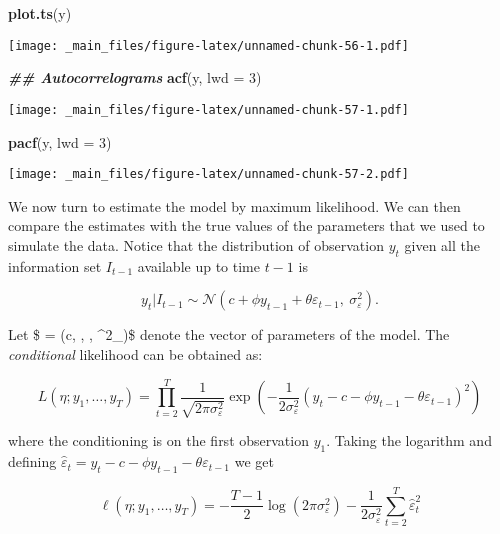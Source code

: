 \documentclass[
]{book}
\newenvironment{Shaded}{\begin{snugshade}}{\end{snugshade}}
\newcommand{\AttributeTok}[1]{\textcolor[rgb]{0.13,0.29,0.53}{#1}}
\newcommand{\DecValTok}[1]{\textcolor[rgb]{0.00,0.00,0.81}{#1}}
\newcommand{\DocumentationTok}[1]{\textcolor[rgb]{0.56,0.35,0.01}{\textbf{\textit{#1}}}}
\newcommand{\FunctionTok}[1]{\textcolor[rgb]{0.13,0.29,0.53}{\textbf{#1}}}
\newcommand{\NormalTok}[1]{#1}
\begin{document}
\begin{Shaded}
\begin{Highlighting}[]
\FunctionTok{plot.ts}\NormalTok{(y)}
\end{Highlighting}
\end{Shaded}

\texttt{[image: \_main\_files/figure-latex/unnamed-chunk-56-1.pdf]}

\begin{Shaded}
\begin{Highlighting}[]
\DocumentationTok{\#\# Autocorrelograms}
\FunctionTok{acf}\NormalTok{(y, }\AttributeTok{lwd =} \DecValTok{3}\NormalTok{)}
\end{Highlighting}
\end{Shaded}

\texttt{[image: \_main\_files/figure-latex/unnamed-chunk-57-1.pdf]}

\begin{Shaded}
\begin{Highlighting}[]
\FunctionTok{pacf}\NormalTok{(y, }\AttributeTok{lwd =} \DecValTok{3}\NormalTok{)}
\end{Highlighting}
\end{Shaded}

\texttt{[image: \_main\_files/figure-latex/unnamed-chunk-57-2.pdf]}

We now turn to estimate the model by maximum likelihood. We can then compare the estimates with the true values of the parameters that we used to simulate the data. Notice that the distribution of observation \(y_t\) given all the information set \(I_{t-1}\) available up to time \(t-1\) is

\[
y_t | I_{t-1} \sim \mathcal{N}(c + \phi y_{t-1} + \theta \varepsilon_{t-1}, \ \sigma^2_\varepsilon).
\]

Let \$ \eta = (c, \phi, \theta, \sigma\^{}2\_\varepsilon)\$ denote the vector of parameters of the model. The \emph{conditional} likelihood can be obtained as:

\[
L(\eta; y_1, \dots, y_T) = \prod_{t=2}^T \frac{1}{\sqrt{2\pi\sigma^2_{\varepsilon}}} \exp\left( -\frac{1}{2\sigma^2_\varepsilon} (y_t - c - \phi y_{t-1} - \theta \varepsilon_{t-1} )^2  \right) 
\]

where the conditioning is on the first observation \(y_1\). Taking the logarithm and defining \(\hat \varepsilon_t = y_t - c - \phi y_{t-1} - \theta \varepsilon_{t-1}\) we get

\[
\ell(\eta ;  y_1, \dots, y_T)  =  - \frac{T-1}{2} \log(2\pi\sigma^2_\varepsilon) - \frac{1}{2\sigma^2_\varepsilon} \sum_{t=2}^T \hat\varepsilon_t^2
\]
\end{document}
